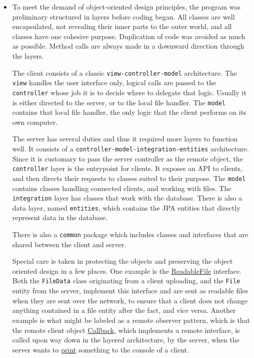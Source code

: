 \documentclass[a4paper]{scrartcl}
\def\code#1{\texttt{#1}}
\begin{document}
\begin{itemize}
    \item To meet the demand of object-oriented design principles, the program was preliminary structured in layers before coding began. All classes are well encapsulated, not revealing their inner parts to the outer world, and all classes have one cohesive purpose. Duplication of code was avoided as much as possible. Method calls are always made in a downward direction through the layers.

        The client consists of a classic \code{view-controller-model} architecture. The \code{view} handles the user interface only, logical calls are passed to the \code{controller} whose job it is to decide where to delegate that logic. Usually it is either directed to the server, or to the local file handler. The \code{model} contains that local file handler, the only logic that the client performs on its own computer.

        The server has several duties and thus it required more layers to function well. It consists of a \code{controller-model-integration-entities} architecture. Since it is customary to pass the server controller as the remote object, the \code{controller} layer is the entrypoint for clients. It exposes an API to clients, and then directs their requests to classes suited to their purpose. The \code{model} contains classes handling connected clients, and working with files. The \code{integration} layer has classes that work with the database. There is also a data layer, named \code{entities}, which contains the JPA entities that directly represent data in the database.

        There is also a \code{common} package which includes classes and interfaces that are shared between the client and server.

        Special care is taken in protecting the objects and preserving the object oriented design in a few places. One example is the \href{https://github.com/fongie/Filehandler/blob/master/common/common/ReadableFile.java}{ReadableFile} interface. Both the \code{FileData} class originating from a client uploading, and the \code{File} entity from the server, implement this interface and are sent as readable files when they are sent over the network, to ensure that a client does not change anything contained in a file entity after the fact, and vice versa. Another example is what might be labeled as a remote observer pattern, which is that the remote client object \href{https://github.com/fongie/Filehandler/blob/143ac2e6c4f62b801610bd51a0752c945b97d358/filehandler_client/src/main/java/view/UserInterface.java#L250}{Callback}, which implements a remote interface, is called upon way down in the layered architecture, by the server, when the server wants to \href{https://github.com/fongie/Filehandler/blob/master/filehandler_server/src/main/java/model/Client.java#L19}{print} something to the console of a client.
    

\end{itemize}
\end{document}
